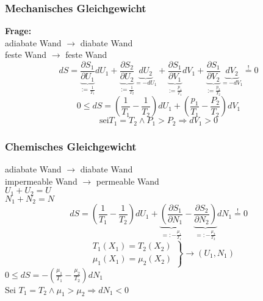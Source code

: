 \documentclass[10pt]{scrartcl}
\begin{document}
\begin{fleqn}
\subsubsection{Mechanisches Gleichgewicht}
\textbf{Frage:}\\
 adiabate Wand $\rightarrow$ diabate Wand\\
 feste Wand $\rightarrow$ feste Wand
\begin{equation}
  dS=\underbrace{\frac{\partial S_1}{\partial U_1}}_{:=\frac{1}{T_1}}dU_1 + \underbrace{\frac{\partial S_2}{\partial U_2}}_{:=\frac{1  }{T_2}}\underbrace{dU_2}_{=-dU_1} +\underbrace{\frac{\partial S_1}{\partial V_1}}_{:=\frac{p_1}{T_1}}dV_1 +
  \underbrace{\frac{\partial S_1}{\partial V_2}}_{:=\frac{p_2}{T_2}}\underbrace{dV_2}_{=-dV_1}\stackrel{!}{=}0
\end{equation}
\begin{equation}
0\leq dS=\left(\frac{1}{T_1}-\frac{1}{T_2}\right)dU_1 +\left(\frac{p_1}{T_1}-\frac{P_2}{T_2}\right)dV_1
\end{equation}
\begin{equation}
\text{sei} T_1=T_2 \wedge P_1 >P_2 \Rightarrow dV_1>0
\end{equation}
\subsubsection{Chemisches Gleichgewicht}
adiabate Wand $\rightarrow$ diabate Wand\\
impermeable Wand $\rightarrow$ permeable Wand\\
$U_1+U_2=U$\\
$N_1 + N_2 = N$
\begin{equation}
  dS= \left(\frac{1}{T_1}-\frac{1}{T_2}\right)dU_1+\underbrace{\left(\frac{\partial S_1}{\partial N_1}\right.}_{=:-\frac{\mu_1}{T_1}}
  -\underbrace{\left.\frac{\partial S_2}{\partial N_2}\right)}_{=:-\frac{\mu_2}{T_2}}dN_1\stackrel{!}{=}0
\end{equation}
\begin{equation}
 \left. 
  \begin{aligned}
    &T_1(X_1)=T_2(X_2)\\
    &\mu_1(X_1)=\mu_2(X_2)
  \end{aligned}
 \right\} \rightarrow (U_1,N_1)
\end{equation}
$ 0 \leq dS = - \left( \frac{\mu_1}{T_1} - \frac{\mu_2}{T_2} \right) dN_1 $ \\
Sei $T_1=T_2 \wedge \mu_1 > \mu_2 \Rightarrow dN_1 < 0 $

\end{fleqn}
\end{document}
